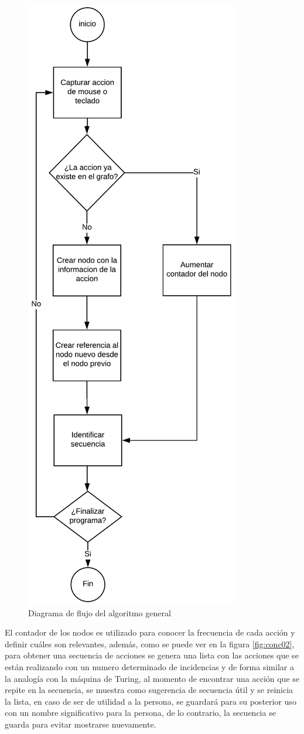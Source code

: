 \begin{figure}[]
\centering
\includegraphics[width=0.5\columnwidth]{chap4/Imagenes/concepto1.eps}
\caption{Diagrama de flujo del algoritmo general}
\label{fig:conc01}
\end{figure} 

El contador de los nodos es utilizado para conocer la frecuencia de cada 
 acci\'on y definir cu\'ales son relevantes, adem\'as, como se puede ver 
 en la figura \ref{fig:conc02}, para obtener una secuencia de acciones se
 genera una lista con las acciones que se est\'an realizando con un numero 
 determinado de incidencias y de forma similar a la analog\'ia con la m\'aquina
 de Turing, al momento de encontrar una acci\'on que se repite en la secuencia,
 se muestra como sugerencia de secuencia \'util y se reinicia la lista, en 
 caso de ser de utilidad a la persona, se guardar\'a para su posterior 
 uso con un nombre significativo para la persona, de lo contrario, la 
 secuencia se guarda para evitar mostrarse nuevamente.

